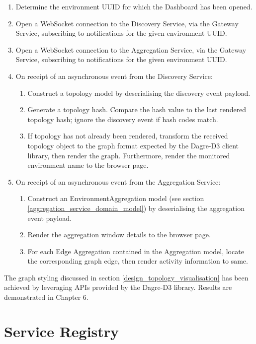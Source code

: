 \begin{enumerate}
\item Determine the environment UUID for which the Dashboard has been opened.
\item Open a WebSocket connection to the Discovery Service, via the Gateway Service, subscribing to notifications for the given environment UUID. 
\item Open a WebSocket connection to the Aggregation Service, via the Gateway Service, subscribing to notifications for the given environment UUID. 
\item On receipt of an asynchronous event from the Discovery Service:
	\begin{enumerate}
		\item Construct a topology model by deserialising the discovery event payload.
		\item Generate a topology hash. Compare the hash value to the last rendered topology hash; ignore the discovery event if hash codes match.
		\item If topology has not already been rendered, transform the received topology object to the graph format expected by the Dagre-D3 client library, then render the graph. Furthermore, render the monitored environment name to the browser page.
	\end{enumerate}
\item On receipt of an asynchronous event from the Aggregation Service:
\begin{enumerate}
	\item Construct an EnvironmentAggregation model (see section \ref{aggregation_service_domain_model}) by deserialising the aggregation event payload.
	\item Render the aggregation window details to the browser page.
	\item For each Edge Aggregation contained in the Aggregation model, locate the corresponding graph edge, then render activity information to same.
\end{enumerate}
\end{enumerate}

The graph styling discussed in section \ref{design_topology_visualisation} has been achieved by leveraging APIs provided by the Dagre-D3 library. Results are demonstrated in Chapter 6. 

 \section{Service Registry}
 

